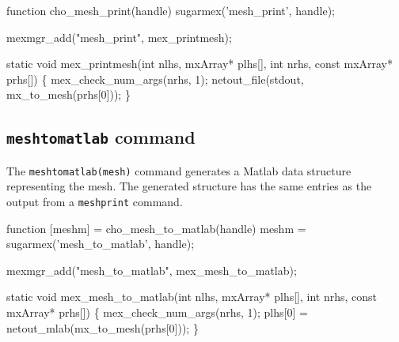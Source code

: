 \nwenddocs{}\endmoddef
function cho_mesh_print(handle)
sugarmex('mesh_print', handle);
\nwendcode{}\nwdocspar

\nwenddocs{}\plusendmoddef
mexmgr_add("mesh_print", mex_printmesh);
\nwendcode{}\nwdocspar

\nwenddocs{}\plusendmoddef
static void mex_printmesh(int nlhs, mxArray* plhs[],
                          int nrhs, const mxArray* prhs[])
\{
    mex_check_num_args(nrhs, 1);
    netout_file(stdout, mx_to_mesh(prhs[0]));
\}

\nwendcode{}\nwdocspar


\subsection{{\tt{}mesh{}to{}matlab} command}

The {\tt{}mesh{}to{}matlab(mesh)} command generates a Matlab data structure
representing the mesh.  The generated structure has the same entries
as the output from a {\tt{}mesh{}print} command.

\nwenddocs{}\endmoddef
function [meshm] = cho_mesh_to_matlab(handle)
meshm = sugarmex('mesh_to_matlab', handle);
\nwendcode{}\nwdocspar

\nwenddocs{}\plusendmoddef
mexmgr_add("mesh_to_matlab", mex_mesh_to_matlab);
\nwendcode{}\nwdocspar

\nwenddocs{}\plusendmoddef
static void mex_mesh_to_matlab(int nlhs, mxArray* plhs[],
                               int nrhs, const mxArray* prhs[])
\{
    mex_check_num_args(nrhs, 1);
    plhs[0] = netout_mlab(mx_to_mesh(prhs[0]));
\}

